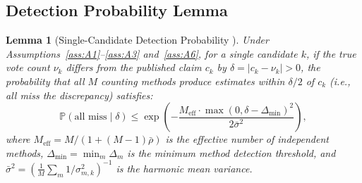 \documentclass[11pt,a4paper]{article}
\newtheorem{lemma}[theorem]{Lemma}
\theoremstyle{definition}
\newcommand{\Pbb}{\mathbb{P}}
\begin{document}
\subsection{Detection Probability Lemma}
\begin{lemma}[Single-Candidate Detection Probability ]
\label{lem:single_candidate}
Under Assumptions~\ref{ass:A1}--\ref{ass:A3} and~\ref{ass:A6}, for a single candidate $k$, if the true vote count $\nu_k$ differs from the published claim $c_k$ by $\delta = |c_k - \nu_k| > 0$, the probability that all $M$ counting methods produce estimates within $\delta/2$ of $c_k$ (i.e., all miss the discrepancy) satisfies:
\begin{equation}
    \Pbb(\text{all miss} \mid \delta) \leq \exp\left(-\frac{M_{\text{eff}} \cdot \max(0, \delta - \Delta_{\min})^2}{2\bar{\sigma}^2}\right),
    \label{eq:single_detection}
\end{equation}
where $M_{\text{eff}} = M / (1 + (M-1)\bar{\rho})$ is the effective number of independent methods, $\Delta_{\min} = \min_m \Delta_m$ is the minimum method detection threshold, and $\bar{\sigma}^2 = (\frac{1}{M} \sum_m 1/\sigma_{m,k}^2)^{-1}$ is the harmonic mean variance.
\end{lemma}
\end{document}

